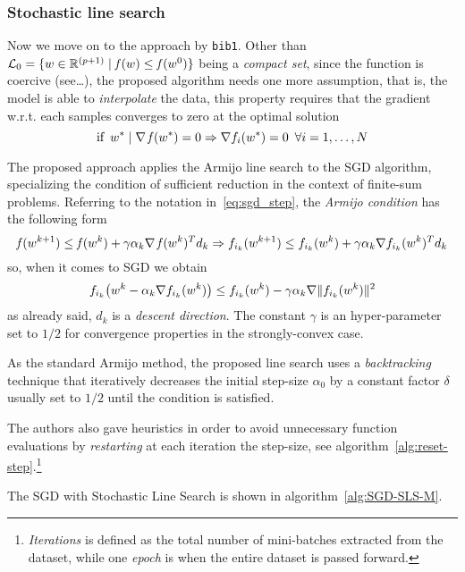 \subsubsection{Stochastic line search}

Now we move on to the approach by \texttt{bib1}. Other than $\mathcal{L}_0=\{w\in\mathbb{R}^{(p+1)}\mid\operatorname*{\mathit{f}}(w)\leq\operatorname*{\mathit{f}}(w^0)\}$ being a \emph{compact set}, since the function is coercive (see\dots), the proposed algorithm needs one more assumption, that is, the model is able to \emph{interpolate} the data, this property requires that the gradient w.r.t. each samples converges to zero at the optimal solution
\[
\text{if}\,\,\,w^\ast\mid\nabla\operatorname*{\mathit{f}}(w^\ast)=0\Rightarrow\nabla f_i(w^\ast)=0\,\,\,\forall i=1,\dots,N
\]

The proposed approach applies the Armijo line search to the SGD algorithm, specializing the condition of sufficient reduction in the context of finite-sum problems. Referring to the notation in~\eqref{eq:sgd_step}, the \emph{Armijo condition} has the following form
\[
\operatorname*{\mathit{f}}(w^{k+1})\leq\operatorname*{\mathit{f}}(w^k)+\gamma\alpha_k\nabla\operatorname*{\mathit{f}}(w^k)^Td_k\Rightarrow
f_{i_k}(w^{k+1})\leq f_{i_k}(w^k)+\gamma\alpha_k\nabla f_{i_k}(w^k)^Td_k
\]
so, when it comes to SGD we obtain
\begin{equation}\label{eq:armijo-sls}
f_{i_k}\bigl(w^k-\alpha_k\nabla f_{i_k}(w^k)\bigr)\leq f_{i_k}(w^k)-\gamma\alpha_k\nabla\lVert f_{i_k}(w^k)\rVert^2
\end{equation}
as already said, $d_k$ is a \emph{descent direction}. The constant $\gamma$ is an hyper-parameter set to $1/2$ for convergence properties in the strongly-convex case.

As the standard Armijo method, the proposed line search uses a \emph{backtracking} technique that iteratively decreases the initial step-size $\alpha_0$ by a constant factor $\delta$ usually set to $1/2$ until the condition is satisfied.

The authors also gave heuristics in order to avoid unnecessary function evaluations by \emph{restarting} at each iteration the step-size, see algorithm~\vref{alg:reset-step}.\footnote{\emph{Iterations} is defined as the total number of mini-batches extracted from the dataset, while one \emph{epoch} is when the entire dataset is passed forward.}

The SGD with Stochastic Line Search is shown in algorithm~\vref{alg:SGD-SLS-M}.

